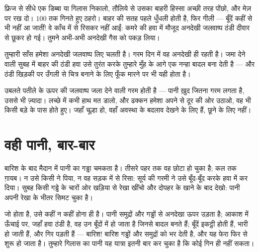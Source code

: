 \begin{example}\label{ex:g2:ice-water-steam:catch}
फ़्रिज से सीधे एक डिब्बा या गिलास निकालो, तौलिये से उसका बाहरी हिस्सा
अच्छी तरह पोंछो, और मेज़ पर रख दो। $100$ तक गिनते हुए ठहरो। बाहर की
सतह पहले धुँधली होती है, फिर गीली --- बूँदें कहीं से भी नहीं आ जातीं!
वे काँच में से रिसकर नहीं आईं: कमरे की हवा में मौजूद अनदेखी जलवाष्प
ठंडी दीवार से छूकर  हो गई। तुमने अभी-अभी अनदेखी गैस को पकड़
लिया।
\end{example}

\begin{example}[साँस के बादल]\label{ex:g2:ice-water-steam:breath}
तुम्हारी साँस हमेशा अनदेखी जलवाष्प लिए चलती है। गरम दिन में वह
अनदेखी ही रहती है। जमा देने वाली सुबह में बाहर की ठंडी हवा उसे तुरंत
 करके तुम्हारे मुँह के आगे एक नन्हा बादल बना देती है --- और
ठंडी खिड़की पर उँगली से चित्र बनाने के लिए फूँक मारने पर भी यही होता
है।
\end{example}

\begin{remark}[भाप और चूल्हा: सावधानी]\label{rem:g2:ice-water-steam:safety}
उबलते पतीले के ऊपर की जलवाष्प जला देने वाली गरम होती है --- पानी
ख़ुद जितना गरम लगता है, उससे भी ज़्यादा। लच्छे में कभी हाथ मत डालो,
और ढक्कन हमेशा अपने से दूर की ओर उठाओ, वह भी किसी बड़े के पास होते
हुए। जहाँ चूल्हा हो, वहाँ अवस्था के बदलाव देखने के लिए हैं, छूने के
लिए नहीं।
\end{remark}

\section{वही पानी, बार-बार}

\begin{example}[सिकुड़ता गड्ढा]\label{ex:g2:ice-water-steam:puddle}
बारिश के बाद मैदान में पानी का गड्ढा चमकता है। तीसरे पहर तक वह छोटा
हो चुका है; कल तक ग़ायब। न उसे किसी ने पिया, न वह सड़क में से रिसा:
सूर्य की गरमी ने उसे बूँद-बूँद करके हवा में  कर दिया। सुबह
किसी गड्ढे के चारों ओर खड़िया से रेखा खींचो और दोपहर के खाने के बाद
देखो: पानी अपनी रेखा के भीतर सिमट चुका है।
\end{example}

\begin{example}[समुद्र से बारिश तक]\label{ex:g2:ice-water-steam:cycle}
जो  होता है, उसे कहीं न कहीं  होना ही है। पानी समुद्रों
और गड्ढों से अनदेखा ऊपर उड़ता है; आकाश में ऊँचाई पर, जहाँ हवा ठंडी
है, वह उन बूँदों में  हो जाता है जिनसे बादल बनते हैं; बूँदें
इकट्ठी होती हैं, भारी हो जाती हैं, और गिर पड़ती हैं --- बारिश!
बारिश गड्ढों और समुद्रों को भर देती है, और यह फेरा फिर से शुरू हो
जाता है। तुम्हारे गिलास का पानी यह यात्रा इतनी बार कर चुका है कि कोई
गिन ही नहीं सकता।
\end{example}

